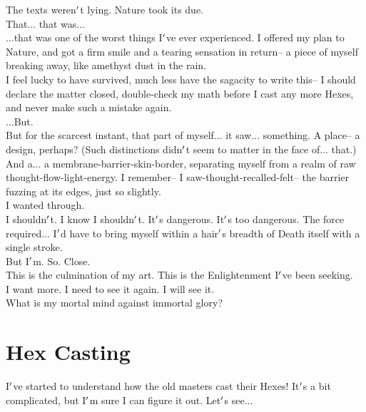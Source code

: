 \documentclass[12pt]{article}
\begin{document}
  
    The texts weren$\rq$t lying. Nature took its due.\\


  
    That... that was...\\...that was one of the worst things I$\rq$ve ever experienced. I offered my plan to Nature, and got a firm smile and a tearing sensation in return-- a piece of myself breaking away, like amethyst dust in the rain.\\I feel lucky to have survived, much less have the sagacity to write this-- I should declare the matter closed, double-check my math before I cast any more Hexes, and never make such a mistake again.\\


  
    ...But.\\But for the scarcest instant, that part of myself... it saw... something. A place-- a design, perhaps? (Such distinctions didn$\rq$t seem to matter in the face of... that.)\\And a... a membrane-barrier-skin-border, separating myself from a realm of raw thought-flow-light-energy. I remember-- I saw-thought-recalled-felt-- the barrier fuzzing at its edges, just so slightly.\\I wanted through.\\


  
    I shouldn$\rq$t. I know I shouldn$\rq$t. It$\rq$s dangerous. It$\rq$s too dangerous. The force required... I$\rq$d have to bring myself within a hair$\rq$s breadth of Death itself with a single stroke.\\But I$\rq$m. So. Close.\\This is the culmination of my art. This is the Enlightenment I$\rq$ve been seeking. \\I want more. I need to see it again. I will see it.\\What is my mortal mind against immortal glory?\\

\newpage

\label{sec:casting}

\section*{Hex Casting}
  I$\rq$ve started to understand how the old masters cast their Hexes! It$\rq$s a bit complicated, but I$\rq$m sure I can figure it out. Let$\rq$s see...\\
\end{document}

